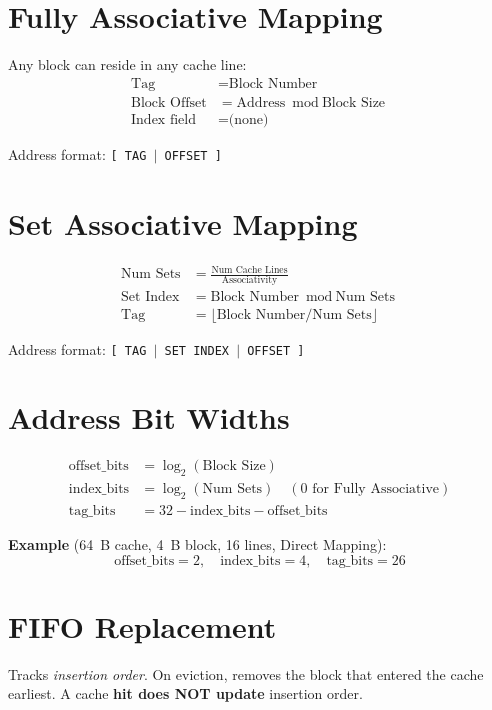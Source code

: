 \documentclass[12pt,a4paper]{report}
\begin{document}
\section{Fully Associative Mapping}
Any block can reside in any cache line:
\begin{align}
\text{Tag} &= \text{Block Number} \\
\text{Block Offset} &= \text{Address} \bmod \text{Block Size} \\
\text{Index field} &= \text{(none)}
\end{align}

Address format: \texttt{[ TAG $|$ OFFSET ]}

\section{Set Associative Mapping}
\begin{align}
\text{Num Sets} &= \frac{\text{Num Cache Lines}}{\text{Associativity}} \\
\text{Set Index} &= \text{Block Number} \bmod \text{Num Sets} \\
\text{Tag}       &= \lfloor\text{Block Number} / \text{Num Sets}\rfloor
\end{align}

Address format: \texttt{[ TAG $|$ SET INDEX $|$ OFFSET ]}

\section{Address Bit Widths}
\begin{align}
\text{offset\_bits} &= \log_2(\text{Block Size}) \\
\text{index\_bits}  &= \log_2(\text{Num Sets}) \quad (0 \text{ for Fully Associative}) \\
\text{tag\_bits}    &= 32 - \text{index\_bits} - \text{offset\_bits}
\end{align}

\textbf{Example} (64~B cache, 4~B block, 16 lines, Direct Mapping):
\[
\text{offset\_bits}=2, \quad \text{index\_bits}=4, \quad \text{tag\_bits}=26
\]

\section{FIFO Replacement}
Tracks \textit{insertion order}. On eviction, removes the block that entered
the cache earliest. A cache \textbf{hit does NOT update} insertion order.
\end{document}
